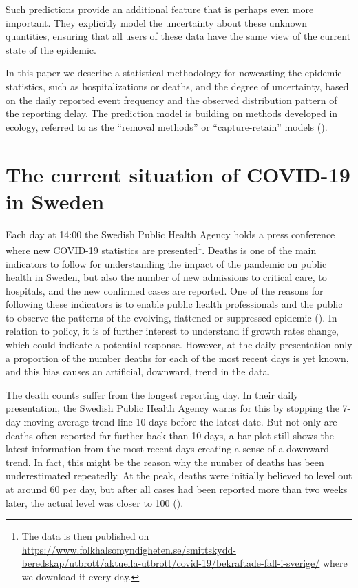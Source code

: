 \documentclass[a4paper,11pt,article,oneside,openany,american]{memoir}
\begin{document}
Such predictions provide an additional feature that is perhaps even more important. They explicitly model the uncertainty about these unknown quantities, ensuring that all users of these data have the same view of the current state of the epidemic.

In this paper we describe a statistical methodology for nowcasting the epidemic statistics, such as hospitalizations or deaths, and the degree of uncertainty, based on the daily reported event frequency and the observed distribution pattern of the reporting delay. The prediction model is building on methods developed in ecology, referred to as the ``removal methods'' or ``capture-retain'' models (\cite{Pollock1991_review_papers}).

\section{The current situation of COVID-19 in Sweden}
Each day at 14:00 the Swedish Public Health Agency holds a press conference where new COVID-19 statistics are presented\footnote{The data is then published on \url{https://www.folkhalsomyndigheten.se/smittskydd-beredskap/utbrott/aktuella-utbrott/covid-19/bekraftade-fall-i-sverige/} where we download it every day.}. Deaths is one of the main indicators to follow for understanding the impact of the pandemic on public health in Sweden, but also the number of new admissions to critical care, to hospitals, and the new confirmed cases are reported. One of the reasons for following these indicators is to enable public health professionals and the public to observe the patterns of the evolving, flattened or suppressed epidemic (\cite{Anderson2020_how_will}). In relation to policy, it is of further interest to understand if growth rates change, which could indicate a potential response. However, at the daily presentation only a proportion of the number deaths for each of the most recent days is yet known, and this bias causes an artificial, downward, trend in the data.

The death counts suffer from the longest reporting day. In their daily presentation, the Swedish Public Health Agency warns for this by stopping the 7-day moving average trend line 10 days before the latest date. But not only are deaths often reported far further back than 10 days, a bar plot still shows the latest information from the most recent days creating a sense of a downward trend. In fact, this might be the reason why the number of deaths has been underestimated repeatedly. At the peak, deaths were initially believed to level out at around 60 per day, but after all cases had been reported more than two weeks later, the actual level was closer to 100 (\cite{Ohman2020_antalet_virusdoda}).
\end{document}
